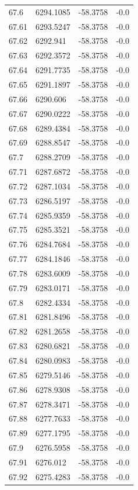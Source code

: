 \begin{table}[H]
\begin{tabular}{llll}
67.6 & 6294.1085 & -58.3758 & -0.0 \\
67.61 & 6293.5247 & -58.3758 & -0.0 \\
67.62 & 6292.941 & -58.3758 & -0.0 \\
67.63 & 6292.3572 & -58.3758 & -0.0 \\
67.64 & 6291.7735 & -58.3758 & -0.0 \\
67.65 & 6291.1897 & -58.3758 & -0.0 \\
67.66 & 6290.606 & -58.3758 & -0.0 \\
67.67 & 6290.0222 & -58.3758 & -0.0 \\
67.68 & 6289.4384 & -58.3758 & -0.0 \\
67.69 & 6288.8547 & -58.3758 & -0.0 \\
67.7 & 6288.2709 & -58.3758 & -0.0 \\
67.71 & 6287.6872 & -58.3758 & -0.0 \\
67.72 & 6287.1034 & -58.3758 & -0.0 \\
67.73 & 6286.5197 & -58.3758 & -0.0 \\
67.74 & 6285.9359 & -58.3758 & -0.0 \\
67.75 & 6285.3521 & -58.3758 & -0.0 \\
67.76 & 6284.7684 & -58.3758 & -0.0 \\
67.77 & 6284.1846 & -58.3758 & -0.0 \\
67.78 & 6283.6009 & -58.3758 & -0.0 \\
67.79 & 6283.0171 & -58.3758 & -0.0 \\
67.8 & 6282.4334 & -58.3758 & -0.0 \\
67.81 & 6281.8496 & -58.3758 & -0.0 \\
67.82 & 6281.2658 & -58.3758 & -0.0 \\
67.83 & 6280.6821 & -58.3758 & -0.0 \\
67.84 & 6280.0983 & -58.3758 & -0.0 \\
67.85 & 6279.5146 & -58.3758 & -0.0 \\
67.86 & 6278.9308 & -58.3758 & -0.0 \\
67.87 & 6278.3471 & -58.3758 & -0.0 \\
67.88 & 6277.7633 & -58.3758 & -0.0 \\
67.89 & 6277.1795 & -58.3758 & -0.0 \\
67.9 & 6276.5958 & -58.3758 & -0.0 \\
67.91 & 6276.012 & -58.3758 & -0.0 \\
67.92 & 6275.4283 & -58.3758 & -0.0 \\

\end{tabular}
\end{table}
